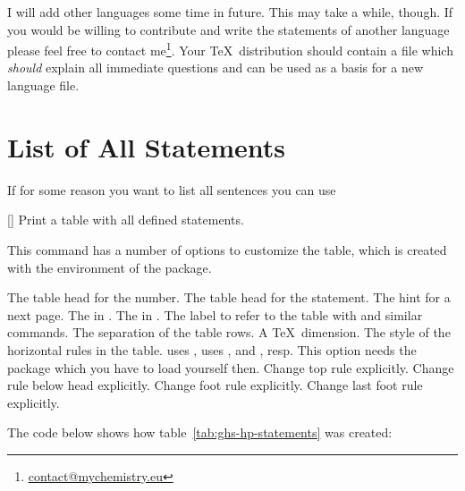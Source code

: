 \documentclass[load-preamble+]{cnltx-doc}
\begin{document}

I will add other languages some time in future.  This may take a while,
though.  If you would be willing to contribute and write the statements of
another language please feel free to contact
me\footnote{\href{mailto:contact@mychemistry.eu}{contact@mychemistry.eu}}.
Your \TeX\ distribution should contain a file
 which \emph{should} explain all immediate
questions and can be used as a basis for a new language file.

\section{List of All Statements}
If for some reason you want to list all sentences you can use
\begin{commands}
  []
    Print a table with all defined statements.
\end{commands}

This command has a number of options to customize the table, which is created
with the  environment of the  package.
\begin{options}
    The table head for the number.
    The table head for the statement.
    The hint for a next page.
    The  in .
  \Default
    The  in .
    The label to refer to the table with  and similar commands.
  \Default{3pt}
    The separation of the table rows. A \TeX\ dimension.
    The style of the horizontal rules in the table.   uses
    ,  uses ,  and
    , resp.  This option needs the  package
    which you have to load yourself then.
    Change top rule explicitly.
    Change rule below head explicitly.
    Change foot rule explicitly.
    Change last foot rule explicitly.
\end{options}

The code below shows how table~\ref{tab:ghs-hp-statements} was created:
\begin{sourcecode}
  \ghslistall[fill-in,table-rules=booktabs]
\end{sourcecode}

\ghslistall[fill-in,table-rules=booktabs]
\end{document}
